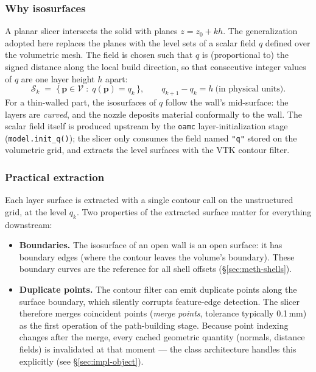 \subsubsection{Why isosurfaces}

A planar slicer intersects the solid with planes
$z = z_0 + k h$. The generalization adopted here replaces the planes
with the level sets of a scalar field $q$ defined over the volumetric
mesh. The field is chosen such that $q$ is (proportional to) the
signed distance along the local build direction, so that consecutive
integer values of $q$ are one layer height $h$ apart:
\begin{equation}
  \mathcal{S}_k \;=\; \{\,\mathbf{p} \in \mathcal{V} \;:\; q(\mathbf{p}) = q_k\,\},
  \qquad q_{k+1} - q_k = h \ \text{(in physical units)}.
\end{equation}
For a thin-walled part, the isosurfaces of $q$ follow the wall's
mid-surface: the layers are \emph{curved}, and the nozzle deposits
material conformally to the wall. The scalar field itself is produced
upstream by the \texttt{oamc} layer-initialization stage
(\texttt{model.init\_q()}); the slicer only consumes the field named
\texttt{"q"} stored on the volumetric grid, and extracts the level
surfaces with the VTK contour filter.

\subsubsection{Practical extraction}

Each layer surface is extracted with a single contour call on the
unstructured grid, at the level $q_k$. Two properties of the extracted
surface matter for everything downstream:

\begin{itemize}
  \item \textbf{Boundaries.} The isosurface of an open wall is an open
        surface: it has boundary edges (where the contour leaves the
        volume's boundary). These boundary curves are the reference for
        all shell offsets (\S\ref{sec:meth-shells}).
  \item \textbf{Duplicate points.} The contour filter can emit
        duplicate points along the surface boundary, which silently
        corrupts feature-edge detection. The slicer therefore merges
        coincident points (\emph{merge points}, tolerance typically
        0.1\,mm) as the first operation of the path-building stage.
        Because point indexing changes after the merge, every cached
        geometric quantity (normals, distance fields) is invalidated at
        that moment --- the class architecture handles this explicitly
        (see \S\ref{sec:impl-object}).
\end{itemize}

